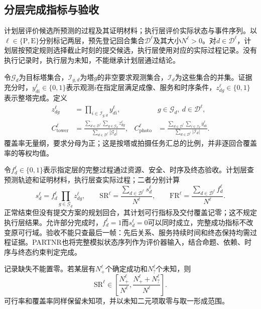 \subsection{分层完成指标与验收}

计划层评价候选所预测的过程及其证明材料；执行层评价实际状态与事件序列。以$\ell\in\{\mathrm P,\mathrm E\}$分别标记两层，预先登记回合集合$\mathcal D^\ell$及其大小$N^\ell>0$。对$d\in\mathcal D^\ell$，计划层按预定规则选择截止时刻的提交候选，执行层使用对应的实际过程记录。没有执行记录时，执行层为未知，不能继承计划层通过结论。

令$\mathcal G_d$为目标塔集合，$\mathcal I_{g,d}$为塔$g$的非空要求观测集合，$\mathcal I_d$为这些集合的并集。证据充分时，$y_{di}^{\ell}\in\{0,1\}$表示观测$i$在指定层满足成像、服务和时序条件，$z_{dg}^{\ell}\in\{0,1\}$表示整塔完成。定义
\begin{align}
 z_{dg}^{\ell}&=\prod_{i\in\mathcal I_{g,d}}y_{di}^{\ell},
 &&g\in\mathcal G_d,\ d\in\mathcal D^\ell,
 \label{s0701:tower}\\
 C_{\mathrm{tower}}^{\ell}&=
 \frac{\sum_{d\in\mathcal D^\ell}\sum_{g\in\mathcal G_d}z_{dg}^{\ell}}
 {\sum_{d\in\mathcal D^\ell}|\mathcal G_d|},
 &C_{\mathrm{photo}}^{\ell}&=
 \frac{\sum_{d\in\mathcal D^\ell}\sum_{i\in\mathcal I_d}y_{di}^{\ell}}
 {\sum_{d\in\mathcal D^\ell}|\mathcal I_d|}.
 \label{s0701:coverage}
\end{align}
覆盖率无量纲，要求分母为正；这是按塔或拍摄任务汇总的比例，并非逐回合覆盖率的等权均值。

令$f_d^{\ell}\in\{0,1\}$表示指定层的完整过程通过资源、安全、时序及终态验收。计划层查预测轨迹和证明材料，执行层查实际过程；二者分别计算
\begin{equation}
 s_d^{\ell}=f_d^{\ell}\prod_{g\in\mathcal G_d}z_{dg}^{\ell},\qquad
 \mathrm{SR}^{\ell}=\frac{\sum_{d\in\mathcal D^\ell}s_d^{\ell}}{N^\ell},\qquad
 \mathrm{FR}^{\ell}=\frac{\sum_{d\in\mathcal D^\ell}f_d^{\ell}}{N^\ell}.
 \label{s0701:success}
\end{equation}
正常结束但没有提交方案的规划回合，其计划可行指标及交付覆盖记零；这不规定执行层结果。允许部分完成时，$f_d^\ell=1$而$s_d^\ell=0$可以同时成立，完整成功指标不改变原可行域。验收不能只查最后一帧：先后关系、服务持续时间和终态保持均需过程证据。PARTNR也将完整模拟状态序列作为评价器输入，结合命题、依赖、时序与终态约束判定完成\cite{PARTNR2025}。

记录缺失不能置零。若某层有$N_+^\ell$个确定成功和$N_?^\ell$个未知，则
\begin{equation}
 \mathrm{SR}^{\ell}\in
 \left[\frac{N_+^\ell}{N^\ell},
 \frac{N_+^\ell+N_?^\ell}{N^\ell}\right].
 \label{s0701:unknown}
\end{equation}
可行率和覆盖率同样保留未知项，并以未知二元项取零与取一形成范围。

